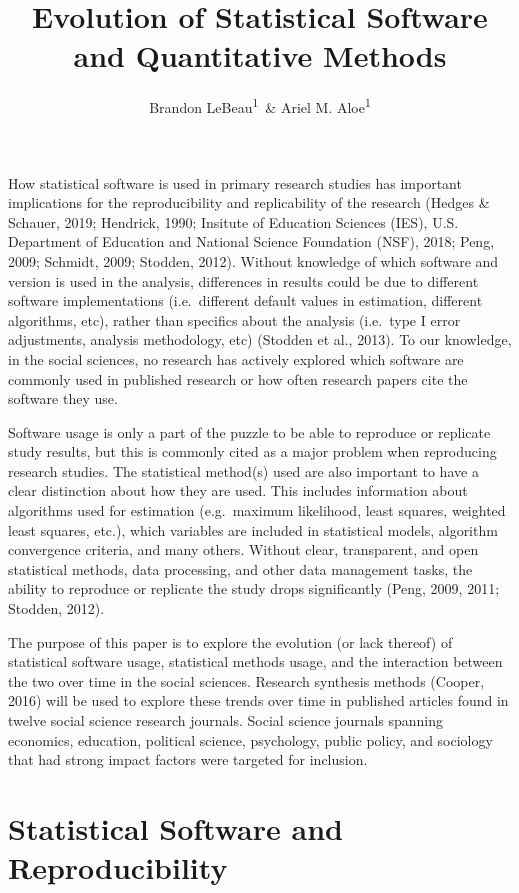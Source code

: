 \documentclass[english,,man]{apa6}
\title{Evolution of Statistical Software and Quantitative Methods}
\author{Brandon LeBeau\textsuperscript{1}~\& Ariel M. Aloe\textsuperscript{1}}
\date{}
\affiliation{
\vspace{0.5cm}
\textsuperscript{1} University of Iowa}
\begin{document}
\maketitle

How statistical software is used in primary research studies has important implications for the reproducibility and replicability of the research (Hedges \& Schauer, 2019; Hendrick, 1990; Insitute of Education Sciences (IES), U.S. Department of Education and National Science Foundation (NSF), 2018; Peng, 2009; Schmidt, 2009; Stodden, 2012). Without knowledge of which software and version is used in the analysis, differences in results could be due to different software implementations (i.e.~different default values in estimation, different algorithms, etc), rather than specifics about the analysis (i.e.~type I error adjustments, analysis methodology, etc) (Stodden et al., 2013). To our knowledge, in the social sciences, no research has actively explored which software are commonly used in published research or how often research papers cite the software they use.

Software usage is only a part of the puzzle to be able to reproduce or replicate study results, but this is commonly cited as a major problem when reproducing research studies. The statistical method(s) used are also important to have a clear distinction about how they are used. This includes information about algorithms used for estimation (e.g.~maximum likelihood, least squares, weighted least squares, etc.), which variables are included in statistical models, algorithm convergence criteria, and many others. Without clear, transparent, and open statistical methods, data processing, and other data management tasks, the ability to reproduce or replicate the study drops significantly (Peng, 2009, 2011; Stodden, 2012).

The purpose of this paper is to explore the evolution (or lack thereof) of statistical software usage, statistical methods usage, and the interaction between the two over time in the social sciences. Research synthesis methods (Cooper, 2016) will be used to explore these trends over time in published articles found in twelve social science research journals. Social science journals spanning economics, education, political science, psychology, public policy, and sociology that had strong impact factors were targeted for inclusion.

\hypertarget{statistical-software-and-reproducibility}{%
\section{Statistical Software and Reproducibility}\label{statistical-software-and-reproducibility}}
\end{document}
